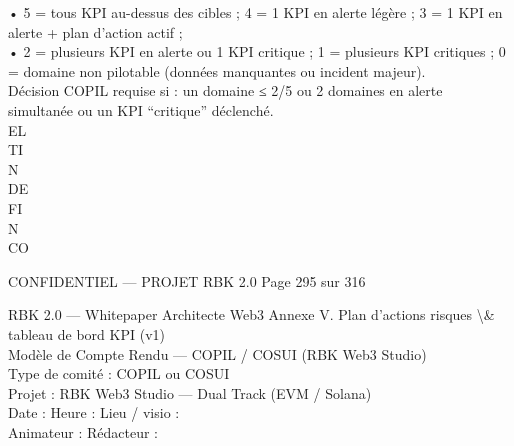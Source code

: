 • 5 = tous KPI au-dessus des cibles ; 4 = 1 KPI en alerte légère ; 3 = 1 KPI en alerte + plan d’action actif ;\\
\vspace{0.5em}
• 2 = plusieurs KPI en alerte ou 1 KPI critique ; 1 = plusieurs KPI critiques ; 0 = domaine non pilotable (données manquantes ou incident majeur).\\
\vspace{0.5em}
Décision COPIL requise si : un domaine ≤ 2/5 ou 2 domaines en alerte simultanée ou un KPI “critique” déclenché.\\
\vspace{0.5em}
\vspace{0.5em}
\vspace{0.5em}
\vspace{0.5em}
EL\\
TI\\
N\\
DE\\
FI\\
N\\
CO\\
\vspace{0.5em}
\vspace{0.5em}
\vspace{0.5em}
\vspace{0.5em}
\begin{confidential}CONFIDENTIEL — PROJET RBK 2.0                                                               Page 295 sur 316\end{confidential}
RBK 2.0 — Whitepaper Architecte Web3                                                                              Annexe V. Plan d’actions risques \textbackslash{}& tableau de bord KPI (v1)\\
\vspace{0.5em}
\vspace{0.5em}
\vspace{0.5em}
Modèle de Compte Rendu — COPIL / COSUI (RBK Web3 Studio)\\
Type de comité : COPIL        ou      COSUI\\
\vspace{0.5em}
Projet : RBK Web3 Studio — Dual Track (EVM / Solana)\\
\vspace{0.5em}
Date :                                    Heure :                      Lieu / visio :\\
\vspace{0.5em}
Animateur :                                              Rédacteur :\\
